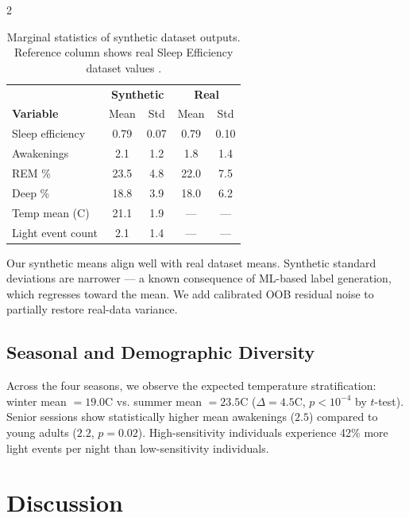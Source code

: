 \documentclass[11pt,a4paper]{article}
\begin{document}
\begin{multicols}{2}
\begin{table}[t]
  \centering
  \small
  \caption{Marginal statistics of synthetic dataset outputs.  Reference column
           shows real Sleep Efficiency dataset values \cite{kaggle_sleep_efficiency}.}
  \label{tab:stats}
  \begin{tabular}{@{}lcccc@{}}
    \toprule
    & \multicolumn{2}{c}{\textbf{Synthetic}} & \multicolumn{2}{c}{\textbf{Real}} \\
    \textbf{Variable} & Mean & Std & Mean & Std \\
    \midrule
    Sleep efficiency & 0.79 & 0.07 & 0.79 & 0.10 \\
    Awakenings & 2.1 & 1.2 & 1.8 & 1.4 \\
    REM \% & 23.5 & 4.8 & 22.0 & 7.5 \\
    Deep \% & 18.8 & 3.9 & 18.0 & 6.2 \\
    Temp mean (\textdegree{}C) & 21.1 & 1.9 & — & — \\
    Light event count & 2.1 & 1.4 & — & — \\
    \bottomrule
  \end{tabular}
\end{table}

Our synthetic means align well with real dataset means.  Synthetic standard
deviations are narrower — a known consequence of ML-based label generation,
which regresses toward the mean.  We add calibrated OOB residual noise to
partially restore real-data variance.

\subsection{Seasonal and Demographic Diversity}

Across the four seasons, we observe the expected temperature stratification:
winter mean $= 19.0$\textdegree{}C vs. summer mean $= 23.5$\textdegree{}C
($\Delta = 4.5$\textdegree{}C, $p < 10^{-4}$ by $t$-test).  Senior sessions
show statistically higher mean awakenings ($2.5$) compared to young adults
($2.2$, $p = 0.02$).  High-sensitivity individuals experience 42\% more
light events per night than low-sensitivity individuals.

\section{Discussion}
\label{sec:discussion}


\end{multicols}
\end{document}
